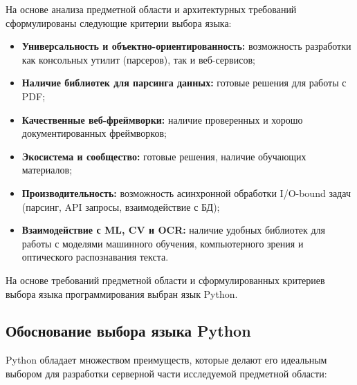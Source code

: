 На основе анализа предметной области и архитектурных требований сформулированы
следующие критерии выбора языка:

\begin{itemize}
	\item \textbf{Универсальность и объектно-ориентированность:} возможность разработки как консольных утилит (парсеров), так и веб-сервисов;
	\item \textbf{Наличие библиотек для парсинга данных:} готовые решения для работы с PDF;
	\item \textbf{Качественные веб-фреймворки:} наличие проверенных и хорошо документированных фреймворков;
	\item \textbf{Экосистема и сообщество:} готовые решения, наличие обучающих материалов;
	\item \textbf{Производительность:} возможность асинхронной обработки I/O-bound задач (парсинг, API запросы, взаимодействие с БД);
	\item \textbf{Взаимодействие с ML, CV и OCR:} наличие удобных библиотек для работы с моделями машинного обучения, компьютерного зрения и оптического распознавания текста.
\end{itemize}

На основе требований предметной области и сформулированных критериев выбора 
языка программирования выбран язык Python.

\subsection{Обоснование выбора языка Python}

Python обладает множеством преимуществ, которые делают его идеальным выбором для разработки серверной части исследуемой предметной области:

